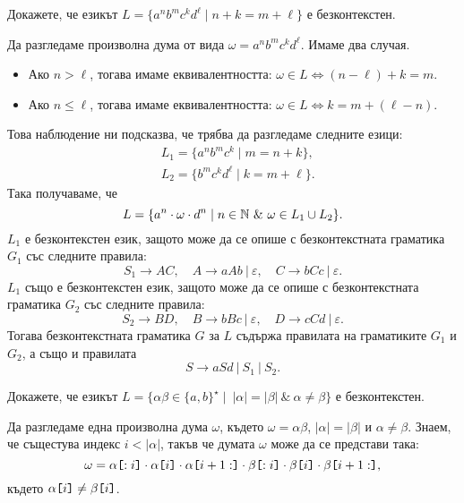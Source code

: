 \begin{extra}
\begin{problem}
  Докажете, че езикът $L = \{a^nb^mc^kd^\ell \mid n+k = m + \ell\}$ е безконтекстен.
\end{problem}
\begin{hint}
  Да разгледаме произволна дума от вида $\omega = a^n b^m c^k d^\ell$.
  Имаме два случая.
  \begin{itemize}
  \item
    Ако $n > \ell$, тогава имаме еквивалентността: $\omega \in L \iff (n-\ell) + k = m$.
  \item
    Ако $n \leq \ell$, тогава имаме еквивалентността: $\omega \in L \iff k = m + (\ell- n)$.
  \end{itemize}
  Това наблюдение ни подсказва, че трябва да разгледаме следните езици:
  \begin{align*}
    & L_1 = \{a^nb^mc^k \mid m = n+k\},\\
    & L_2 = \{b^mc^kd^\ell \mid k = m+\ell\}.
  \end{align*}
  Така получаваме, че
  \[L = \{a^n \cdot \omega \cdot d^n \mid n\in\Nat\ \&\ \omega \in L_1 \cup L_2\}.\]
  $L_1$ е безконтекстен език, защото може да се опише с безконтекстната граматика $G_1$ със следните правила:
  \[S_1 \to AC,\quad  A \to aAb\ |\ \varepsilon,\quad C \to bCc\ |\ \varepsilon.\]
  $L_1$ също е безконтекстен език, защото може да се опише с безконтекстната граматика $G_2$ със следните правила:
  \[S_2 \to BD,\quad B \to bBc\ |\ \varepsilon,\quad D \to cCd\ |\ \varepsilon.\]
  Тогава безконтекстната граматика $G$ за $L$ 
  съдържа правилата на граматиките $G_1$ и $G_2$, а също и правилата
  \[S \to aSd\ |\ S_1\ |\ S_2.\]
\end{hint}

\begin{problem}
  \label{prob:equal-but-different}
  Докажете, че езикът $L = \{\alpha\beta \in \{a,b\}^\star \mid\ |\alpha| = |\beta|\ \&\ \alpha \neq \beta\}$ е безконтекстен.
\end{problem}
\begin{hint}
  Да разгледаме една произволна дума $\omega$, където $\omega = \alpha\beta$, $|\alpha| = |\beta|$ и $\alpha \neq \beta$.
  Знаем, че същестува индекс $i < |\alpha|$, такъв че думата $\omega$ може да се представи така:
  \[\omega = \alpha\texttt{[}{:i}\texttt{]} \cdot \alpha\texttt{[}{i}\texttt{]} \cdot \alpha\texttt{[}{i+1:}\texttt{]} \cdot \beta\texttt{[}{:i}\texttt{]} \cdot \beta\texttt{[}{i}\texttt{]} \cdot \beta\texttt{[}{i+1:}\texttt{]},\]
  където $\alpha\texttt{[}{i}\texttt{]} \neq \beta\texttt{[}{i}\texttt{]}$.


\end{hint}
\end{extra}
